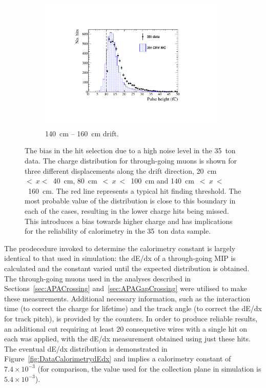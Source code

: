 \begin{figure}
\begin{subfigure}[t]{0.32\linewidth}
    \includegraphics[width=0.98\textwidth]{HitReconstructionBias140-160.pdf}
    \caption{140~cm -- 160~cm drift.}
    \label{fig:DataCalorimetryThreshold3}
  \end{subfigure}
  \caption[The bias in the hit selection due to a high noise level in the 35~ton data.]{The bias in the hit selection due to a high noise level in the 35~ton data.  The charge distribution for through-going muons is shown for three different displacements along the drift direction, 20~cm~$<~x<$~40~cm, 80~cm~$<~x~<$~100~cm and 140~cm~$<~x~<$~160~cm.  The red line represents a typical hit finding threshold.  The most probable value of the distribution is close to this boundary in each of the cases, resulting in the lower charge hits being missed.  This introduces a bias towards higher charge and has implications for the reliability of calorimetry in the 35~ton data sample.}
  \label{fig:DataCalorimetryThreshold}
\end{figure}

The prodecedure invoked to determine the calorimetry constant is largely identical to that used in simulation: the dE/dx of a through-going MIP is calculated and the constant varied until the expected distribution is obtained.  The through-going muons used in the analyses described in Sections~\ref{sec:APACrossing} and~\ref{sec:APAGapCrossing} were utilised to make these measurements.  Additional necessary information, such as the interaction time (to correct the charge for lifetime) and the track angle (to correct the dE/dx for track pitch), is provided by the counters.  In order to produce reliable results, an additional cut requiring at least 20 consequetive wires with a single hit on each was applied, with the dE/dx measurement obtained using just these hits.  The eventual dE/dx distribution is demonstrated in Figure~\ref{fig:DataCalorimetrydEdx} and implies a calorimetry constant of $7.4\times10^{-3}$ (for comparison, the value used for the collection plane in simulation is $5.4\times10^{-3}$).

